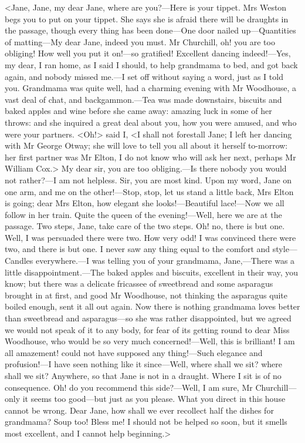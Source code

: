 <Jane, Jane, my dear Jane, where are you?—Here is your tippet. Mrs Weston begs you to put on your tippet. She says she is afraid there will be draughts in the passage, though every thing has been done—One door nailed up—Quantities of matting—My dear Jane, indeed you must. Mr Churchill, oh! you are too obliging! How well you put it on!—so gratified! Excellent dancing indeed!—Yes, my dear, I ran home, as I said I should, to help grandmama to bed, and got back again, and nobody missed me.—I set off without saying a word, just as I told you. Grandmama was quite well, had a charming evening with Mr Woodhouse, a vast deal of chat, and backgammon.—Tea was made downstairs, biscuits and baked apples and wine before she came away: amazing luck in some of her throws: and she inquired a great deal about you, how you were amused, and who were your partners. <Oh!> said I, <I shall not forestall Jane; I left her dancing with Mr George Otway; she will love to tell you all about it herself to-morrow: her first partner was Mr Elton, I do not know who will ask her next, perhaps Mr William Cox.> My dear sir, you are too obliging.—Is there nobody you would not rather?—I am not helpless. Sir, you are most kind. Upon my word, Jane on one arm, and me on the other!—Stop, stop, let us stand a little back, Mrs Elton is going; dear Mrs Elton, how elegant she looks!—Beautiful lace!—Now we all follow in her train. Quite the queen of the evening!—Well, here we are at the passage. Two steps, Jane, take care of the two steps. Oh! no, there is but one. Well, I was persuaded there were two. How very odd! I was convinced there were two, and there is but one. I never saw any thing equal to the comfort and style—Candles everywhere.—I was telling you of your grandmama, Jane,—There was a little disappointment.—The baked apples and biscuits, excellent in their way, you know; but there was a delicate fricassee of sweetbread and some asparagus brought in at first, and good Mr Woodhouse, not thinking the asparagus quite boiled enough, sent it all out again. Now there is nothing grandmama loves better than sweetbread and asparagus—so she was rather disappointed, but we agreed we would not speak of it to any body, for fear of its getting round to dear Miss Woodhouse, who would be so very much concerned!—Well, this is brilliant! I am all amazement! could not have supposed any thing!—Such elegance and profusion!—I have seen nothing like it since—Well, where shall we sit? where shall we sit? Anywhere, so that Jane is not in a draught. Where I sit is of no consequence. Oh! do you recommend this side?—Well, I am sure, Mr Churchill—only it seems too good—but just as you please. What you direct in this house cannot be wrong. Dear Jane, how shall we ever recollect half the dishes for grandmama? Soup too! Bless me! I should not be helped so soon, but it smells most excellent, and I cannot help beginning.>

